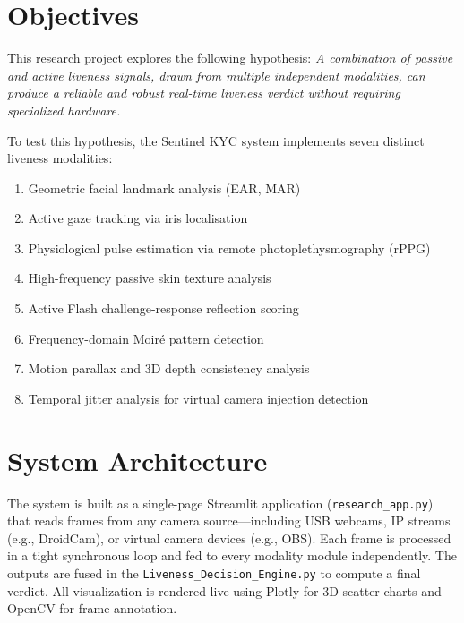 \documentclass[12pt,a4paper]{report}
\begin{document}
\section{Objectives}
This research project explores the following hypothesis: \textit{A combination of passive and active liveness signals, drawn from multiple independent modalities, can produce a reliable and robust real-time liveness verdict without requiring specialized hardware.}

To test this hypothesis, the Sentinel KYC system implements seven distinct liveness modalities:
\begin{enumerate}
    \item Geometric facial landmark analysis (EAR, MAR)
    \item Active gaze tracking via iris localisation
    \item Physiological pulse estimation via remote photoplethysmography (rPPG)
    \item High-frequency passive skin texture analysis
    \item Active Flash challenge-response reflection scoring
    \item Frequency-domain Moir\'{e} pattern detection
    \item Motion parallax and 3D depth consistency analysis
    \item Temporal jitter analysis for virtual camera injection detection
\end{enumerate}

\section{System Architecture}
The system is built as a single-page Streamlit application (\texttt{research\_app.py}) that reads frames from any camera source---including USB webcams, IP streams (e.g., DroidCam), or virtual camera devices (e.g., OBS). Each frame is processed in a tight synchronous loop and fed to every modality module independently. The outputs are fused in the \texttt{Liveness\_Decision\_Engine.py} to compute a final verdict. All visualization is rendered live using Plotly for 3D scatter charts and OpenCV for frame annotation.
\end{document}
